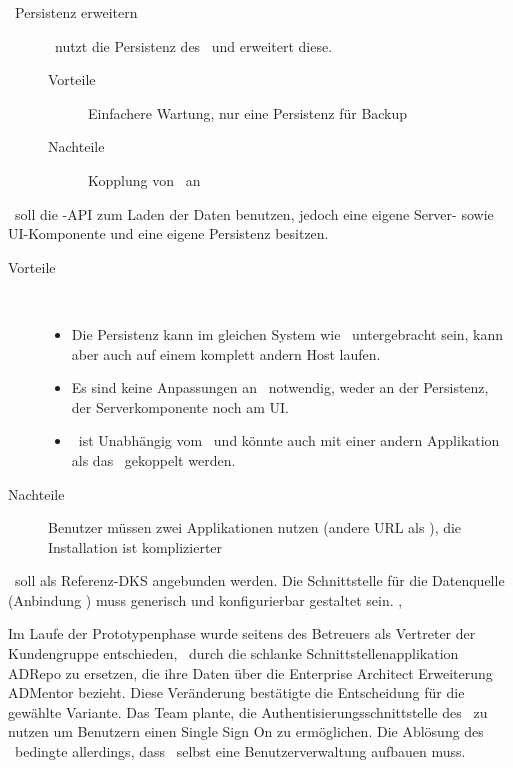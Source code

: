 {{\begin{description}
						\item[\cdar\ Persistenz erweitern]
						\eeppi\ nutzt die Persistenz des \cdar\ und erweitert diese.
						\begin{description}
							\item[Vorteile] Einfachere Wartung, nur eine Persistenz für Backup
							\item[Nachteile] Kopplung von \eeppi\ an \cdar
						\end{description}
					\end{description}
				}
				{
					\eeppi\ soll die \cdar-API zum Laden der Daten benutzen, jedoch eine eigene Server- sowie UI-Komponente und eine eigene Persistenz besitzen. 
					\begin{description}
						\item[Vorteile] \
							\begin{itemize}
								\item Die Persistenz kann im gleichen System wie \cdar\ untergebracht sein, kann aber auch auf einem komplett andern Host laufen.
								\item Es sind keine Anpassungen an \cdar\ notwendig, weder an der Persistenz, der Serverkomponente noch am UI.
								\item \eeppi\ ist Unabhängig vom \cdar\ und könnte auch mit einer andern Applikation als das \cdar\ gekoppelt werden.
							\end{itemize}
						\item[Nachteile] Benutzer müssen zwei Applikationen nutzen (andere URL als \cdar), die Installation ist komplizierter
					\end{description}
				}
				{\cdar\ soll als Referenz-DKS angebunden werden.}
				{Die Schnittstelle für die Datenquelle (Anbindung \cdar) muss generisch und konfigurierbar gestaltet sein.}
				{
					, 
				}
			}
			
			
			Im Laufe der Prototypenphase wurde seitens des Betreuers als Vertreter der Kundengruppe entschieden, 
			\cdar\ durch die schlanke Schnittstellenapplikation ADRepo zu ersetzen, 
			die ihre Daten über die Enterprise Architect Erweiterung ADMentor bezieht. 
			Diese Veränderung bestätigte die Entscheidung für die gewählte Variante.
			Das Team plante, die Authentisierungsschnittstelle des \cdar\ zu nutzen um Benutzern einen Single Sign On zu ermöglichen.
			Die Ablösung des \cdar\ bedingte allerdings, dass \eeppi\ selbst eine Benutzerverwaltung aufbauen muss.
		
